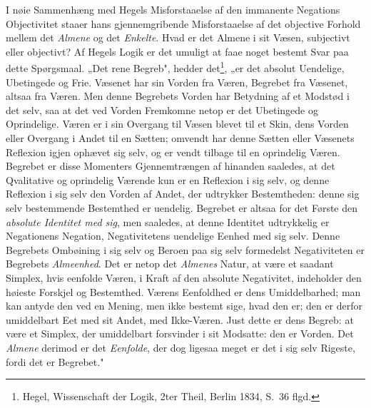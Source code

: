 \documentclass[12pt]{book}
\newcommand{\opage}[1]{\marginnote{\footnotesize\textit{[#1]}}}
\begin{document}
I nøie Sammenhæng med Hegels Misforstaaelse af den immanente Negations Objectivitet staaer
hans gjennemgribende Misforstaaelse af det objective Forhold mellem det \emph{Almene} og det
\emph{Enkelte}. Hvad er det Almene i sit Væsen, subjectivt eller objectivt? Af Hegels Logik er
det umuligt at faae noget bestemt Svar paa dette Spørgsmaal. „Det rene Begreb", hedder
det\footnote{Hegel, Wissenschaft der Logik, 2ter Theil, Berlin 1834, S.~36 flgd.}, „er det
absolut Uendelige, Ubetingede og Frie. Væsenet har sin Vorden fra Væren, Begrebet fra Væsenet,
altsaa fra Væren. Men denne Begrebets Vorden har Betydning af et Modstød i det selv, saa at
det ved Vorden Fremkomne netop er det Ubetingede og Oprindelige. Væren er i sin Overgang til
Væsen blevet til et Skin, dens Vorden eller Overgang i Andet til en Sætten; omvendt har denne
Sætten eller Væsenets Reflexion igjen ophævet sig selv, og er vendt tilbage til en oprindelig
Væren. Begrebet er disse Momenters Gjennemtrængen af hinanden saaledes, at det Qvalitative og
oprindelig Værende kun er en Reflexion i sig selv, og denne Reflexion i sig selv den Vorden af
Andet, der udtrykker Bestemtheden: denne sig selv bestemmende Bestemthed er uendelig. Begrebet
er altsaa for det Første den \emph{absolute Identitet med sig}, men saaledes, at denne
Identitet udtrykkelig er Negationens Negation, Negativitetens uendelige Eenhed med sig selv.
Denne Begrebets Ombøining i sig selv og Beroen paa sig selv formedelst Negativiteten er
Begrebets \emph{Almeenhed}. Det er netop det \emph{Almenes} Natur, at være et saadant Simplex,
hvis eenfolde Væren, i Kraft af den absolute Negativitet, indeholder den høieste Forskjel og
Bestemthed. Værens Eenfoldhed er dens Umiddelbarhed; man kan antyde den ved en Mening, men
ikke bestemt sige, hvad
\opage{152} den er; den er derfor umiddelbart Eet med sit Andet, med Ikke-Væren. Just dette er dens
Begreb: at være et Simplex, der umiddelbart forsvinder i sit Modsatte: den er Vorden. Det
\emph{Almene} derimod er det \emph{Eenfolde}, der dog ligesaa meget er det i sig selv Rigeste,
fordi det er Begrebet."
\end{document}
